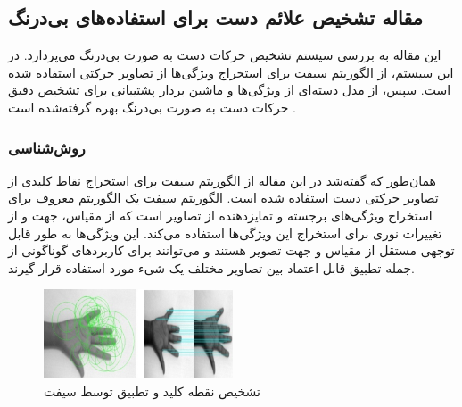 
\subsection[مقاله تشخيص علائم دست برای استفاده‌های بی‌درنگ]{مقاله تشخيص علائم دست برای استفاده‌های بی‌درنگ \protect{}}
این مقاله به بررسی سیستم تشخیص حرکات دست به صورت بی‌درنگ می‌پردازد. در این سیستم، از الگوریتم سیفت  برای استخراج ویژگی‌ها از تصاویر حرکتی استفاده شده است. سپس، از مدل دسته‌ای از ویژگی‌ها  و ماشین بردار پشتیبانی برای تشخیص دقیق حرکات دست به صورت بی‌درنگ بهره گرفته‌شده‌ است \cite{murugeswari2014hand}.


\subsubsection{روش‌شناسی}
همان‌طور که گفته‌شد در این مقاله از الگوریتم سیفت  برای استخراج نقاط کلیدی از تصاویر حرکتی دست استفاده شده است. الگوریتم سیفت یک الگوریتم معروف برای استخراج ویژگی‌های برجسته 
و تمایزدهنده از تصاویر است که از مقیاس، جهت و از تغییرات نوری برای استخراج این ویژگی‌ها استفاده می‌کند. این ویژگی‌ها به طور قابل توجهی مستقل از 
مقیاس و جهت تصویر هستند و می‌توانند برای کاربرد‌های گوناگونی از جمله تطبیق قابل اعتماد بین تصاویر مختلف یک شیء مورد استفاده قرار گیرند.

\begin{figure}[h]
    \centering
    \includegraphics[width=0.5\textwidth]{SIFT.png}
    \caption[تشخیص نقطه کلید و تطبیق توسط سیفت ]{تشخیص نقطه کلید و تطبیق توسط سیفت \cite{murugeswari2014hand}}
\end{figure}

